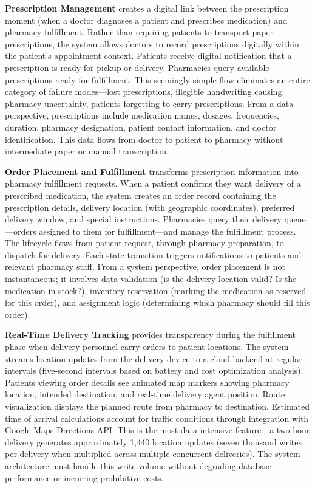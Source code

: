 \documentclass[12pt,a4paper]{report}
\begin{document}
\textbf{Prescription Management} creates a digital link between the prescription moment (when a doctor diagnoses a patient and prescribes medication) and pharmacy fulfillment. Rather than requiring patients to transport paper prescriptions, the system allows doctors to record prescriptions digitally within the patient's appointment context. Patients receive digital notification that a prescription is ready for pickup or delivery. Pharmacies query available prescriptions ready for fulfillment. This seemingly simple flow eliminates an entire category of failure modes—lost prescriptions, illegible handwriting causing pharmacy uncertainty, patients forgetting to carry prescriptions. From a data perspective, prescriptions include medication names, dosages, frequencies, duration, pharmacy designation, patient contact information, and doctor identification. This data flows from doctor to patient to pharmacy without intermediate paper or manual transcription.

\textbf{Order Placement and Fulfillment} transforms prescription information into pharmacy fulfillment requests. When a patient confirms they want delivery of a prescribed medication, the system creates an order record containing the prescription details, delivery location (with geographic coordinates), preferred delivery window, and special instructions. Pharmacies query their delivery queue—orders assigned to them for fulfillment—and manage the fulfillment process. The lifecycle flows from patient request, through pharmacy preparation, to dispatch for delivery. Each state transition triggers notifications to patients and relevant pharmacy staff. From a system perspective, order placement is not instantaneous; it involves data validation (is the delivery location valid? Is the medication in stock?), inventory reservation (marking the medication as reserved for this order), and assignment logic (determining which pharmacy should fill this order).

\textbf{Real-Time Delivery Tracking} provides transparency during the fulfillment phase when delivery personnel carry orders to patient locations. The system streams location updates from the delivery device to a cloud backend at regular intervals (five-second intervals based on battery and cost optimization analysis). Patients viewing order details see animated map markers showing pharmacy location, intended destination, and real-time delivery agent position. Route visualization displays the planned route from pharmacy to destination. Estimated time of arrival calculations account for traffic conditions through integration with Google Maps Directions API. This is the most data-intensive feature—a two-hour delivery generates approximately 1,440 location updates (seven thousand writes per delivery when multiplied across multiple concurrent deliveries). The system architecture must handle this write volume without degrading database performance or incurring prohibitive costs.
\end{document}
